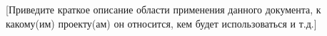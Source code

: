 [Приведите краткое описание области применения данного документа, к какому(им) проекту(ам) он относится, кем будет использоваться и т.д.]